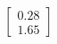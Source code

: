 \documentclass[preview]{standalone}
\begin{document}
\begin{align*}
\begin{bmatrix} 0.28 \\ 1.65 \end{bmatrix}
\end{align*}
\end{document}
